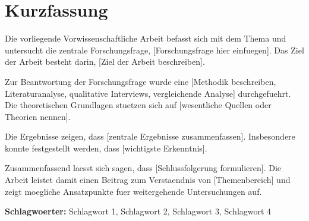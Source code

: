 
\chapter*{Kurzfassung}


Die vorliegende Vorwissenschaftliche Arbeit befasst sich mit dem Thema
\grqq{} und untersucht die zentrale Forschungsfrage,
[Forschungsfrage hier einfuegen]. Das Ziel der Arbeit besteht darin,
[Ziel der Arbeit beschreiben].

Zur Beantwortung der Forschungsfrage wurde eine [Methodik beschreiben,
\zB Literaturanalyse, qualitative Interviews, vergleichende Analyse]
durchgefuehrt. Die theoretischen Grundlagen stuetzen sich auf
[wesentliche Quellen oder Theorien nennen].

Die Ergebnisse zeigen, dass [zentrale Ergebnisse zusammenfassen].
Insbesondere konnte festgestellt werden, dass [wichtigste Erkenntnis].

Zusammenfassend laesst sich sagen, dass [Schlussfolgerung formulieren].
Die Arbeit leistet damit einen Beitrag zum Verstaendnis von
[Themenbereich] und zeigt moegliche Ansatzpunkte fuer weitergehende
Untersuchungen auf.

\vskip 5mm
\noindent\textbf{Schlagwoerter:} Schlagwort 1, Schlagwort 2, Schlagwort 3, Schlagwort 4
